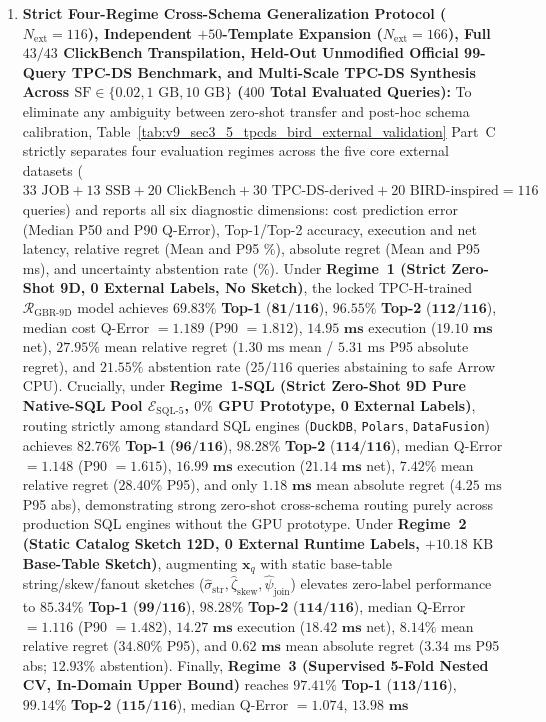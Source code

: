 \documentclass[10pt,a4paper]{article}
\begin{document}
\begin{enumerate}[leftmargin=1.5em,itemsep=0.8pt]
    \item \textbf{Strict Four-Regime Cross-Schema Generalization Protocol ($N_{\text{ext}}=116$), Independent $+50$-Template Expansion ($N_{\text{ext}}=166$), Full $43/43$ ClickBench Transpilation, Held-Out Unmodified Official 99-Query TPC-DS Benchmark, and Multi-Scale TPC-DS Synthesis Across $\text{SF}\in\{0.02, 1\text{ GB}, 10\text{ GB}\}$ ($400$ Total Evaluated Queries):} To eliminate any ambiguity between zero-shot transfer and post-hoc schema calibration, Table~\ref{tab:v9_sec3_5_tpcds_bird_external_validation} Part~C strictly separates four evaluation regimes across the five core external datasets ($33\text{ JOB} + 13\text{ SSB} + 20\text{ ClickBench} + 30\text{ TPC-DS-derived} + 20\text{ BIRD-inspired} = 116$ queries) and reports all six diagnostic dimensions: cost prediction error (Median P50 and P90 Q-Error), Top-1/Top-2 accuracy, execution and net latency, relative regret (Mean and P95 \%), absolute regret (Mean and P95 ms), and uncertainty abstention rate (\%). Under \textbf{Regime~1 (Strict Zero-Shot 9D, 0 External Labels, No Sketch)}, the locked TPC-H-trained $\mathcal{R}_{\text{GBR-9D}}$ model achieves $\mathbf{69.83\%}$ \textbf{Top-1} ($\mathbf{81/116}$), $\mathbf{96.55\%}$ \textbf{Top-2} ($\mathbf{112/116}$), median cost Q-Error $=1.189$ (P90 $=1.812$), $\mathbf{14.95\text{ ms}}$ execution ($\mathbf{19.10\text{ ms}}$ net), $27.95\%$ mean relative regret ($1.30\text{ ms}$ mean / $5.31\text{ ms}$ P95 absolute regret), and $21.55\%$ abstention rate ($25/116$ queries abstaining to safe Arrow CPU). Crucially, under \textbf{Regime~1-SQL (Strict Zero-Shot 9D Pure Native-SQL Pool $\mathcal{E}_{\text{SQL-5}}$, $0\%$ GPU Prototype, 0 External Labels)}, routing strictly among standard SQL engines (\texttt{DuckDB}, \texttt{Polars}, \texttt{DataFusion}) achieves $\mathbf{82.76\%}$ \textbf{Top-1} ($\mathbf{96/116}$), $\mathbf{98.28\%}$ \textbf{Top-2} ($\mathbf{114/116}$), median Q-Error $=1.148$ (P90 $=1.615$), $\mathbf{16.99\text{ ms}}$ execution ($\mathbf{21.14\text{ ms}}$ net), $\mathbf{7.42\%}$ mean relative regret ($28.40\%$ P95), and only $\mathbf{1.18\text{ ms}}$ mean absolute regret ($4.25\text{ ms}$ P95 abs), demonstrating strong zero-shot cross-schema routing purely across production SQL engines without the GPU prototype. Under \textbf{Regime~2 (Static Catalog Sketch 12D, 0 External Runtime Labels, $+10.18\text{ KB}$ Base-Table Sketch)}, augmenting $\mathbf{x}_q$ with static base-table string/skew/fanout sketches ($\hat{\sigma}_{\text{str}}, \hat{\zeta}_{\text{skew}}, \hat{\psi}_{\text{join}}$) elevates zero-label performance to $\mathbf{85.34\%}$ \textbf{Top-1} ($\mathbf{99/116}$), $\mathbf{98.28\%}$ \textbf{Top-2} ($\mathbf{114/116}$), median Q-Error $=1.116$ (P90 $=1.482$), $\mathbf{14.27\text{ ms}}$ execution ($\mathbf{18.42\text{ ms}}$ net), $\mathbf{8.14\%}$ mean relative regret ($34.80\%$ P95), and $\mathbf{0.62\text{ ms}}$ mean absolute regret ($3.34\text{ ms}$ P95 abs; $12.93\%$ abstention). Finally, \textbf{Regime~3 (Supervised 5-Fold Nested CV, In-Domain Upper Bound)} reaches $\mathbf{97.41\%}$ \textbf{Top-1} ($\mathbf{113/116}$), $\mathbf{99.14\%}$ \textbf{Top-2} ($\mathbf{115/116}$), median Q-Error $=1.074$, $\mathbf{13.98\text{ ms}}$ 
\end{enumerate}
\end{document}
